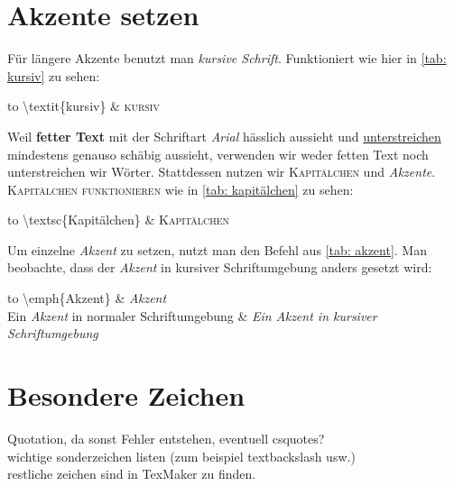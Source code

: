 \section{Akzente setzen}%
Für längere Akzente benutzt man \textit{kursive Schrift}. Funktioniert wie hier in \ref{tab: kursiv} zu sehen:\\%
\begin{table}[h]%
\label{tab: kursiv}%
\begin{tabu} to \textwidth {X[c]X[c]}%
\toprule%
\textbackslash textit\{kursiv\} & \textsc{kursiv} \\%
\bottomrule%
\end{tabu}%
\caption{kursiv}%
\end{table}%
%
%
Weil \textbf{fetter Text} mit der Schriftart \emph{Arial} hässlich aussieht und \underline{unterstreichen} mindestens genauso schäbig aussieht, verwenden wir weder fetten Text noch unterstreichen wir Wörter. Stattdessen nutzen wir \textsc{Kapitälchen} und \emph{Akzente}. \textsc{Kapitälchen funktionieren} wie in \ref{tab: kapitälchen} zu sehen:\\%
\begin{table}[h]%
\label{tab: kapitälchen}%
\begin{tabu} to \textwidth {X[c]X[c]}%
\toprule%
\textbackslash textsc\{Kapitälchen\} & \textsc{Kapitälchen} \\%
\bottomrule%
\end{tabu}%
\caption{Kapitälchen}%
\end{table}%
%
%
Um einzelne \emph{Akzent} zu setzen, nutzt man den Befehl aus \ref{tab: akzent}. Man beobachte, dass der \emph{Akzent} in kursiver Schriftumgebung anders gesetzt wird:%
\begin{table}[h]%
\label{tab: akzent}%
\begin{tabu} to \textwidth {X[c]X[c]}%
\toprule%
\textbackslash emph\{Akzent\} & \emph{Akzent} \\%
Ein \emph{Akzent} in normaler Schriftumgebung & \textit{Ein \emph{Akzent} in kursiver Schriftumgebung}\\%
\bottomrule%
\end{tabu}%
\caption{Akzent}%
\end{table}%
%
%
\section{Besondere Zeichen}%
Quotation, da sonst Fehler entstehen, eventuell csquotes?\\%
wichtige sonderzeichen listen (zum beispiel textbackslash usw.)\\%
restliche zeichen sind in TexMaker zu finden.%